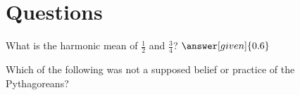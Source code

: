 \documentclass{ximera}
\begin{document}
\section{Questions}

\begin{question}
What is the harmonic mean of $\frac12$ and $\frac34$? $\answer[given]{0.6}$
\end{question}

\begin{question}
Which of the following was not a supposed belief or practice of the Pythagoreans?
\begin{multipleChoice}
\end{multipleChoice}
\end{question}


\end{document}
